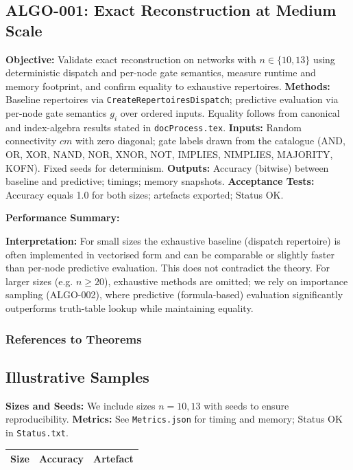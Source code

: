 \subsection{ALGO-001: Exact Reconstruction at Medium Scale}
\textbf{Objective:} Validate exact reconstruction on networks with \(n\in\{10,13\}\) using deterministic dispatch and per-node gate semantics, measure runtime and memory footprint, and confirm equality to exhaustive repertoires.
\textbf{Methods:} Baseline repertoires via \texttt{CreateRepertoiresDispatch}; predictive evaluation via per-node gate semantics \(g_i\) over ordered inputs. Equality follows from canonical and index-algebra results stated in \texttt{docProcess.tex}.
\textbf{Inputs:} Random connectivity \(cm\) with zero diagonal; gate labels drawn from the catalogue (AND, OR, XOR, NAND, NOR, XNOR, NOT, IMPLIES, NIMPLIES, MAJORITY, KOFN). Fixed seeds for determinism.
\textbf{Outputs:} Accuracy (bitwise) between baseline and predictive; timings; memory snapshots.
\textbf{Acceptance Tests:} Accuracy equals 1.0 for both sizes; artefacts exported; Status OK.

\textbf{Performance Summary:}

\textbf{Interpretation:} For small sizes the exhaustive baseline (dispatch repertoire) is often implemented in vectorised form and can be comparable or slightly faster than per-node predictive evaluation. This does not contradict the theory. For larger sizes (e.g. \(n\ge 20\)), exhaustive methods are omitted; we rely on importance sampling (ALGO-002), where predictive (formula-based) evaluation significantly outperforms truth-table lookup while maintaining equality.

\subsubsection{References to Theorems}

\subsection{Illustrative Samples}
\textbf{Sizes and Seeds:} We include sizes \(n=10,13\) with seeds to ensure reproducibility.
\textbf{Metrics:} See \texttt{Metrics.json} for timing and memory; Status OK in \texttt{Status.txt}.
\begin{center}
\begin{tabular}{lcc}
\toprule
\textbf{Size} & \textbf{Accuracy} & \textbf{Artefact} \\
\midrule
\bottomrule
\end{tabular}
\end{center}

